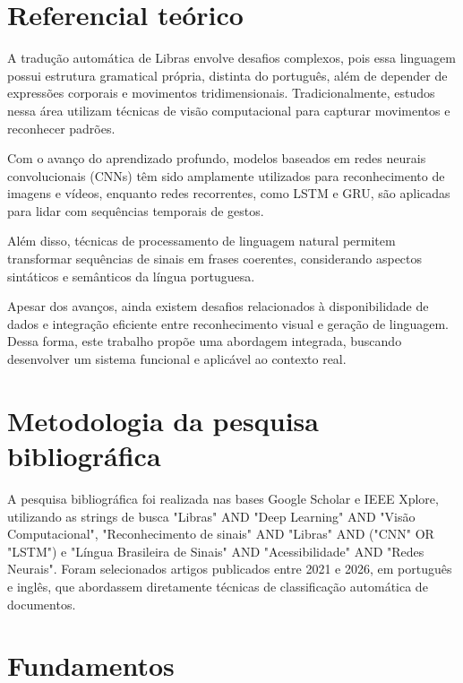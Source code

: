 \documentclass[
    12pt,                %
    openright,           %
    oneside,             %
    a4paper,             %
    english,             %
    brazil               %
]{abntex2}
\begin{document}
\section{Referencial teórico}
\label{sec:referencial}

A tradução automática de Libras envolve desafios complexos, pois essa linguagem possui estrutura gramatical própria, distinta do português, além de depender de expressões corporais e movimentos tridimensionais. Tradicionalmente, estudos nessa área utilizam técnicas de visão computacional para capturar movimentos e reconhecer padrões.

Com o avanço do aprendizado profundo, modelos baseados em redes neurais convolucionais (CNNs) têm sido amplamente utilizados para reconhecimento de imagens e vídeos, enquanto redes recorrentes, como LSTM e GRU, são aplicadas para lidar com sequências temporais de gestos.

Além disso, técnicas de processamento de linguagem natural permitem transformar sequências de sinais em frases coerentes, considerando aspectos sintáticos e semânticos da língua portuguesa. 

Apesar dos avanços, ainda existem desafios relacionados à disponibilidade de dados e integração eficiente entre reconhecimento visual e geração de linguagem. Dessa forma, este trabalho propõe uma abordagem integrada, buscando desenvolver um sistema funcional e aplicável ao contexto real.

\section{Metodologia da pesquisa bibliográfica}
\label{sec:metodologia_pesquisa}

A pesquisa bibliográfica foi realizada nas bases Google Scholar e IEEE Xplore, utilizando as strings de busca "Libras" AND "Deep Learning" AND "Visão Computacional", "Reconhecimento de sinais" AND "Libras" AND ("CNN" OR "LSTM") e "Língua Brasileira de Sinais" AND "Acessibilidade" AND "Redes Neurais". Foram selecionados artigos publicados entre 2021 e 2026, em português e inglês, que abordassem diretamente técnicas de classificação automática de documentos.


\section{Fundamentos}
\label{sec:fundamentos}
\end{document}
